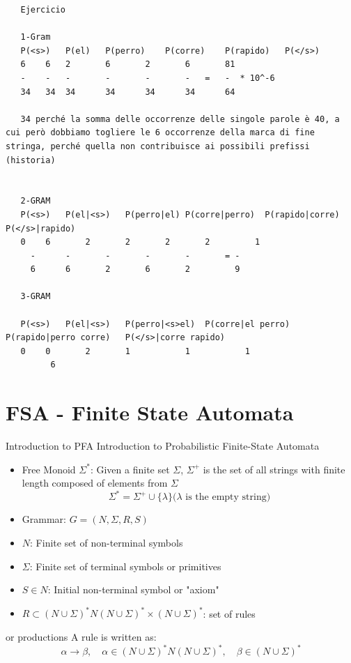 \begin{verbatim}
   Ejercicio

   1-Gram
   P(<s>)	P(el)	P(perro)	P(corre)	P(rapido)	P(</s>)
   6	6	2		6		2		6		81
   -	-	-		-		-		-	=	-  * 10^-6
   34	34	34		34		34		34		64
   
   34 perché la somma delle occorrenze delle singole parole è 40, a cui però dobbiamo togliere le 6 occorrenze della marca di fine stringa, perché quella non contribuisce ai possibili prefissi (historia)    

   
   2-GRAM
   P(<s>) 	P(el|<s>)	P(perro|el)	P(corre|perro)	P(rapido|corre)	P(</s>|rapido)
   0	6		2		2		2		2		  1
     -		-		-		-		-		= -		
     6		6		2		6		2		  9
   
   3-GRAM
   
   P(<s>)	P(el|<s>)	P(perro|<s>el)	P(corre|el perro)	P(rapido|perro corre)	P(</s>|corre rapido)
   0	0		2		1			1			1
         6

\end{verbatim}

\section{FSA - Finite State Automata}
Introduction to PFA
Introduction to Probabilistic Finite-State Automata
\begin{itemize}
   \item Free Monoid $\Sigma^*$: Given a finite set $\Sigma$, $\Sigma^+$ is the set of all strings with finite length composed of elements from $\Sigma$
   \begin{equation}
      \Sigma^* = \Sigma^+ \cup \{\lambda\} \text{($\lambda$ is the empty string)}
   \end{equation}
   \item Grammar: $G = (N, \Sigma, R, S)$
\end{itemize}
\begin{itemize}
   \item $N$: Finite set of non-terminal symbols
   \item $\Sigma$: Finite set of terminal symbols or primitives
   \item $S \in N$: Initial non-terminal symbol or "axiom"
   \item $R \subset (N \cup \Sigma)^*N(N \cup \Sigma)^* \times (N \cup \Sigma)^*$: set of rules
\end{itemize} or productions
A rule is written as:
\begin{equation}
   \alpha \rightarrow \beta,\quad \alpha \in (N \cup \Sigma)^*N(N \cup \Sigma)^*, \quad \beta \in (N \cup \Sigma)^*
\end{equation}

